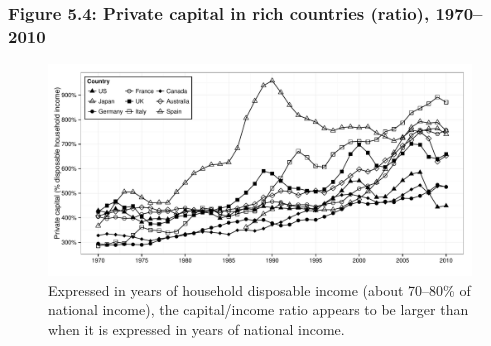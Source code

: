 \documentclass[t]{beamer}\usepackage[]{graphicx}\usepackage[]{color}
\newenvironment{knitrout}{}{} %
\begin{document}
\begin{frame}[label=Figure_5_4]
\frametitle{Figure 5.4: Private capital in rich countries (ratio), 1970--2010}
\begin{figure}[t]
\begin{minipage}[b]{\textwidth}
\centering
\begin{knitrout}\footnotesize
{}\color{fgcolor}

{\centering \includegraphics[width=1\linewidth]{figures/bw/Figure_5_4} 

}



\end{knitrout}
\caption{Expressed in years of household disposable income (about 70--80\% of national income), the capital/income ratio appears to be larger than when it is expressed in years of national income.}
\end{minipage}
\end{figure}
\end{frame}
\end{document}
